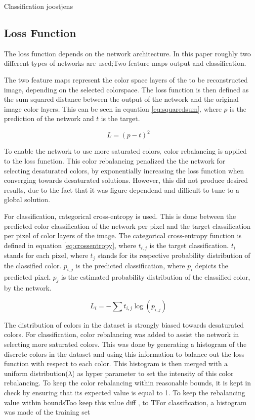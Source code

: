 {\color{red} Classification joostjens}

\subsection{Loss Function}
The loss function depends on the network architecture. In this paper roughly two different types of networks are used;Two feature maps output and classification. 

The two feature maps represent the color space layers of the to be reconstructed image, depending on the selected colorspace. The loss function is then defined as the sum squared distance between the output of the network and the original image color layers. This can be seen in equation \ref{eq:squaredsum}, where $p$ is the prediction of the network and $t$ is the target. 

\begin{equation}
\label{eq:squaredsum}
L = (p - t)^2
\end{equation}

To enable the network to use more saturated colors, color rebalancing is applied to the loss function. This color rebalancing penalized the the network for selecting desaturated colors, by exponentially increasing the loss function when converging towards desaturated solutions. However, this did not produce desired results, due to the fact that it was figure dependend and difficult to tune to a global solution. 

For classification, categorical cross-entropy is used. This is done between the predicted color classification of the network per pixel and the target classification per pixel of color layers of the image. The categorical cross-entropy function is defined in equation \ref{eq:crossentropy}, where $t_{i,j}$ is the target classification. $t_i$ stands for each pixel, where $t_j$ stands for its respective probability distribution of the classified color. 
$p_{i,j}$ is the predicted classification, where $p_{i}$ depicts the predicted pixel. $p_{j}$ is the estimated probability distribution of the classified color, by the network.  

\begin{equation}
\label{eq:crossentropy}
L_{i} = -\sum t_{i,j}\log(p_{i,j})
\end{equation}

The distribution of colors in the dataset is strongly biased towards desaturated colors. For classification, color rebalancing was added to assist the network in selecting more saturated colors. This was done by generating a histogram of the discrete colors in the dataset and using this information to balance out the loss function with respect to each color. This histogram is then merged with a uniform distribution($\lambda$) as hyper parameter to set the intensity of this color rebalancing. To keep the color rebalancing within reasonable bounds, it is kept in check by ensuring that its expected value is equal to 1. To keep the rebalancing value within boundsToo keep this value diff , to TFor classification, a histogram was made of the training set
 
